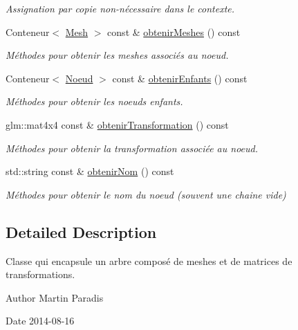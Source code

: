 \begin{DoxyCompactItemize}
\begin{DoxyCompactList}\small\item\em Assignation par copie non-\/nécessaire dans le contexte. \end{DoxyCompactList}\item 
Conteneur$<$ \hyperlink{classmodele_1_1_mesh}{Mesh} $>$ const \& \hyperlink{classmodele_1_1_noeud_a101a25623ebba2600f8543a6c19679e0}{obtenir\+Meshes} () const 
\begin{DoxyCompactList}\small\item\em Méthodes pour obtenir les meshes associés au noeud. \end{DoxyCompactList}\item 
Conteneur$<$ \hyperlink{classmodele_1_1_noeud}{Noeud} $>$ const \& \hyperlink{classmodele_1_1_noeud_a6963aeb02dc79278f93e83f0289c8d0f}{obtenir\+Enfants} () const 
\begin{DoxyCompactList}\small\item\em Méthodes pour obtenir les noeuds enfants. \end{DoxyCompactList}\item 
glm\+::mat4x4 const \& \hyperlink{classmodele_1_1_noeud_a87e5e968095dc830b8f1a008453f816f}{obtenir\+Transformation} () const 
\begin{DoxyCompactList}\small\item\em Méthodes pour obtenir la transformation associée au noeud. \end{DoxyCompactList}\item 
std\+::string const \& \hyperlink{classmodele_1_1_noeud_a92bd556c458afa1a690b7b253a6557fd}{obtenir\+Nom} () const 
\begin{DoxyCompactList}\small\item\em Méthodes pour obtenir le nom du noeud (souvent une chaine vide) \end{DoxyCompactList}\end{DoxyCompactItemize}


\subsection{Detailed Description}
Classe qui encapsule un arbre composé de meshes et de matrices de transformations. 

\begin{DoxyAuthor}{Author}
Martin Paradis 
\end{DoxyAuthor}
\begin{DoxyDate}{Date}
2014-\/08-\/16 
\end{DoxyDate}


